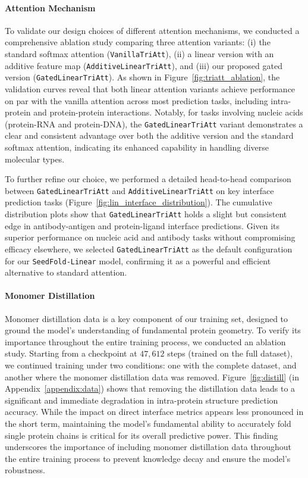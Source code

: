 \paragraph{Attention Mechanism}
To validate our design choices of different attention mechanisms, we conducted a comprehensive ablation study comparing three attention variants: (i) the standard softmax attention (\texttt{VanillaTriAtt}), (ii) a linear version with an additive feature map (\texttt{AdditiveLinearTriAtt}), and (iii) our proposed gated version (\texttt{GatedLinearTriAtt}). As shown in Figure~\ref{fig:triatt_ablation}, the validation curves reveal that both linear attention variants achieve performance on par with the vanilla attention across most prediction tasks, including intra-protein and protein-protein interactions. Notably, for tasks involving nucleic acids (protein-RNA and protein-DNA), the \texttt{GatedLinearTriAtt} variant demonstrates a clear and consistent advantage over both the additive version and the standard softmax attention, indicating its enhanced capability in handling diverse molecular types.

To further refine our choice, we performed a detailed head-to-head comparison between \texttt{GatedLinearTriAtt} and \texttt{AdditiveLinearTriAtt} on key interface prediction tasks (Figure~\ref{fig:lin_interface_distribution}). The cumulative distribution plots show that \texttt{GatedLinearTriAtt} holds a slight but consistent edge in antibody-antigen and protein-ligand interface predictions. Given its superior performance on nucleic acid and antibody tasks without compromising efficacy elsewhere, we selected \texttt{GatedLinearTriAtt} as the default configuration for our \texttt{SeedFold-Linear} model, confirming it as a powerful and efficient alternative to standard attention.



\paragraph{Monomer Distillation}
Monomer distillation data is a key component of our training set, designed to ground the model's understanding of fundamental protein geometry. To verify its importance throughout the entire training process, we conducted an ablation study. Starting from a checkpoint at $47,612$ steps (trained on the full dataset), we continued training under two conditions: one with the complete dataset, and another where the monomer distillation data was removed. Figure~\ref{fig:distill} (in Appendix~\ref{appendix:data}) shows that removing the distillation data leads to a significant and immediate degradation in intra-protein structure prediction accuracy. While the impact on direct interface metrics appears less pronounced in the short term, maintaining the model's fundamental ability to accurately fold single protein chains is critical for its overall predictive power. This finding underscores the importance of including monomer distillation data throughout the entire training process to prevent knowledge decay and ensure the model's robustness.

